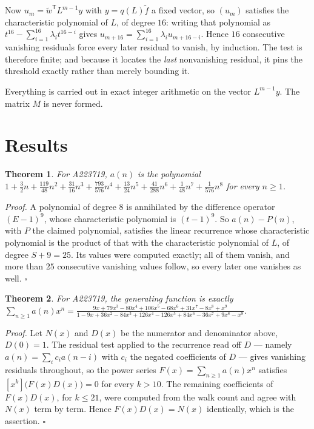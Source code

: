 \documentclass[11pt]{article}
\newtheorem{theorem}{Theorem}
\theoremstyle{definition}
\begin{document}
Now $u_m = \tilde w^{\mathsf T} L^{m-1} y$ with $y = q(L)\tilde f$ a fixed vector, so $(u_m)$ satisfies the characteristic polynomial of $L$, of degree $16$: writing that polynomial as $t^{16} - \sum_{i=1}^{16} \lambda_i t^{16-i}$ gives $u_{m+16} = \sum_{i=1}^{16} \lambda_i u_{m+16-i}$. Hence $16$ consecutive vanishing residuals force every later residual to vanish, by induction. The test is therefore finite; and because it locates the {\itshape last} nonvanishing residual, it pins the threshold exactly rather than merely bounding it.

Everything is carried out in exact integer arithmetic on the vector $L^{m-1}y$. The matrix $M$ is never formed.

\section{Results}

\begin{theorem} For A223719, $a(n)$ is the polynomial $1 + \frac{3}{2}n + \frac{119}{48}n^{2} + \frac{31}{16}n^{3} + \frac{793}{576}n^{4} + \frac{13}{24}n^{5} + \frac{41}{288}n^{6} + \frac{1}{48}n^{7} + \frac{1}{576}n^{8}$ for every $n \ge 1$.\end{theorem}

{\itshape Proof.} A polynomial of degree $8$ is annihilated by the difference operator $(E-1)^{9}$, whose characteristic polynomial is $(t-1)^{9}$. So $a(n) - P(n)$, with $P$ the claimed polynomial, satisfies the linear recurrence whose characteristic polynomial is the product of that with the characteristic polynomial of $L$, of degree $S + 9 = 25$. Its values were computed exactly; all of them vanish, and more than $25$ consecutive vanishing values follow, so every later one vanishes as well. $\square$

\begin{theorem} For A223719, the generating function is exactly $\sum_{n\ge 1} a(n)x^n = \frac{9x + 79x^{3} - 80x^{4} + 106x^{5} - 68x^{6} + 31x^{7} - 8x^{8} + x^{9}}{1 - 9x + 36x^{2} - 84x^{3} + 126x^{4} - 126x^{5} + 84x^{6} - 36x^{7} + 9x^{8} - x^{9}}$.\end{theorem}

{\itshape Proof.} Let $N(x)$ and $D(x)$ be the numerator and denominator above, $D(0)=1$. The residual test applied to the recurrence read off $D$ --- namely $a(n) = \sum_i c_i a(n-i)$ with $c_i$ the negated coefficients of $D$ --- gives vanishing residuals throughout, so the power series $F(x)=\sum_{n\ge 1}a(n)x^n$ satisfies $[x^k]\bigl(F(x)D(x)\bigr) = 0$ for every $k > 10$. The remaining coefficients of $F(x)D(x)$, for $k \le 21$, were computed from the walk count and agree with $N(x)$ term by term. Hence $F(x)D(x) = N(x)$ identically, which is the assertion. $\square$
\end{document}
